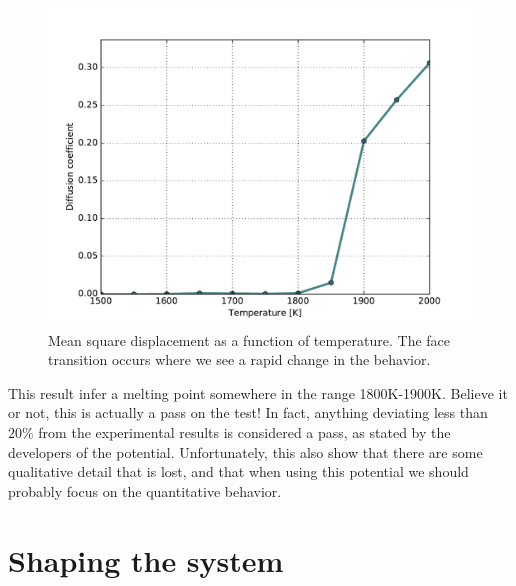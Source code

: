 \documentclass[twoside,english]{uiofysmaster}
\begin{document}

\begin{figure}[H]
\centering
\includegraphics[width=0.7\linewidth]{../SiO2/msd/figures/msd}
\caption{Mean square displacement as a function of temperature. The face transition occurs where we see a rapid change in the behavior.}
\label{fig:msd}
\end{figure}
This result infer a melting point somewhere in the range 1800K-1900K. 
Believe it or not, this is actually a pass on the test! 
In fact, anything deviating less than $20\%$ from the experimental results is considered a pass, as stated by the developers of the potential. 
Unfortunately, this also show that there are some qualitative detail that is lost, and that when using this potential we should probably focus on the quantitative behavior. 





\section{Shaping the system}

\end{document}

